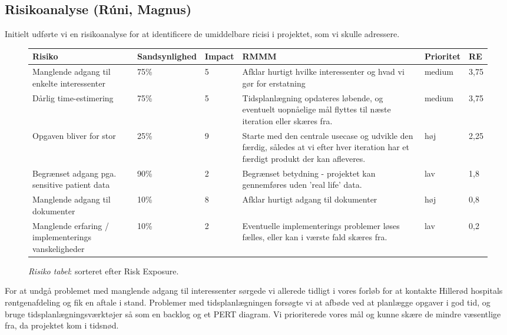 \subsection*{Risikoanalyse (Rúni, Magnus)}
Initielt udførte vi en risikoanalyse for at identificere de umiddelbare ricisi i
projektet, som vi skulle adressere.\\
\FloatBarrier
\begin{figure}
\begin{tabularx}{\textwidth}{| X | l | l | X | l | l |}
\hline
Risiko & Sandsynlighed & Impact & RMMM & Prioritet & RE\\ \hline
Manglende adgang til enkelte interessenter & 75\% & 5 & Afklar hurtigt hvilke
interessenter og hvad vi gør for erstatning & medium & 3,75\\
\hline

Dårlig time-estimering & 75\% & 5 & Tidsplanlægning opdateres løbende, og
eventuelt uopnåelige mål flyttes til næste iteration eller skæres fra. & medium
& 3,75\\ 
\hline \hline

Opgaven bliver for stor & 25\% & 9 & Starte med den centrale usecase og udvikle
den færdig, således at vi efter hver iteration har et færdigt produkt der kan
afleveres. & høj & 2,25\\
\hline

Begrænset adgang pga. sensitive patient data & 90\% & 2 & Begrænset betydning -
projektet kan gennemføres uden 'real life' data. & lav & 1,8\\
\hline

Manglende adgang til dokumenter & 10\% & 8 & Afklar hurtigt adgang til
dokumenter & høj & 0,8\\
\hline

Manglende erfaring / implementerings vanskeligheder & 10\% & 2 & Eventuelle
implementerings problemer løses fælles, eller kan i værste fald skæres fra. &
lav & 0,2\\
\hline
\end{tabularx}
\caption{\emph{Risiko tabel}: sorteret efter Risk Exposure.\label{risiko_tabel}}
\end{figure}
\FloatBarrier
\indent For at undgå problemet med manglende adgang til interessenter sørgede vi
allerede tidligt i vores forløb for at kontakte Hillerød hospitals
røntgenafdeling og fik en aftale i stand. Problemer med tidsplanlægningen
forsøgte vi at afbøde ved at planlægge opgaver i god tid, og bruge
tidsplanlægningsværktøjer så som en backlog og et PERT diagram. Vi prioriterede
vores mål og kunne skære de mindre væsentlige fra, da projektet kom i tidsnød.
